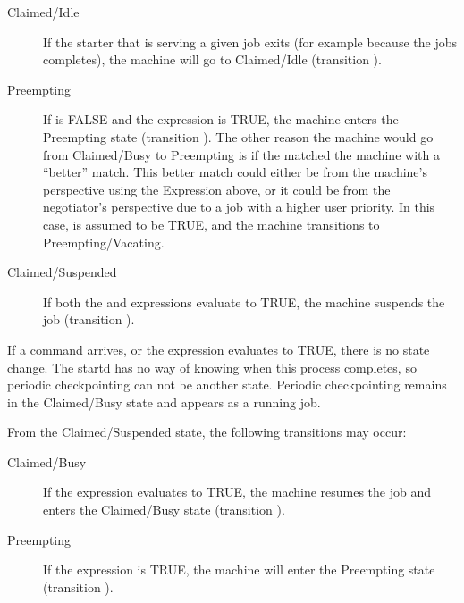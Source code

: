 \begin{description}
  
\item[Claimed/Idle] If the starter that is serving a given job exits
  (for example because the jobs completes), the machine will go
  to Claimed/Idle (transition ).
  
\item[Preempting] If  is FALSE and the
   expression is TRUE, the machine enters the
  Preempting state (transition ).
  The other reason the machine would go from Claimed/Busy to
  Preempting is if the  matched the machine
  with a ``better'' match.  This better match could either be from the
  machine's perspective using the  Expression above,
  or it could be from the negotiator's perspective due to
  a job with a higher user priority.
  In this case,  is assumed to be TRUE, and the
  machine transitions to Preempting/Vacating.
  
\item[Claimed/Suspended] If both the  and
   expressions evaluate to TRUE, the machine
  suspends the job (transition ).
  
\end{description}
  
If a  command arrives,
or the  expression evaluates to TRUE,
there is no state change.
The startd has no way of knowing when this process completes,
so periodic checkpointing can not be another state.
Periodic checkpointing remains in the Claimed/Busy state
and appears as a running job.

From the Claimed/Suspended state, the following transitions
may occur:

\begin{description}
  
\item[Claimed/Busy] If the  expression evaluates to
  TRUE, the machine resumes the job and enters the
  Claimed/Busy state (transition ).

\item[Preempting] If the  expression is TRUE, the machine
  will enter the Preempting state (transition ).

\end{description}


